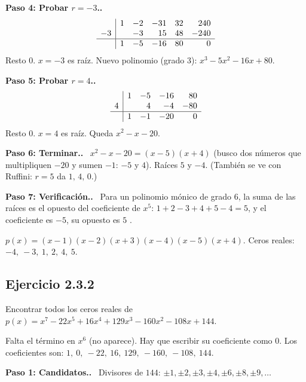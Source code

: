 \documentclass[11pt,a4paper]{article}
\newcommand{\paso}[1]{\par\medskip\noindent\textbf{\textcolor{blue!50!black}{Paso #1.}}\ }
\begin{document}
\paso{4: Probar $r=-3$.}
\[
\begin{array}{r|rrrrr}
 & 1 & -2 & -31 & 32 & 240\\
-3 & & -3 & 15 & 48 & -240\\ \hline
 & 1 & -5 & -16 & 80 & 0
\end{array}
\]
Resto $0$. $x=-3$ es raíz. Nuevo polinomio (grado $3$): $x^3-5x^2-16x+80$.

\paso{5: Probar $r=4$.}
\[
\begin{array}{r|rrrr}
 & 1 & -5 & -16 & 80\\
4 & & 4 & -4 & -80\\ \hline
 & 1 & -1 & -20 & 0
\end{array}
\]
Resto $0$. $x=4$ es raíz. Queda $x^2-x-20$.

\paso{6: Terminar.} $x^2-x-20=(x-5)(x+4)$ (busco dos números que multipliquen $-20$ y sumen $-1$: $-5$ y $4$). Raíces $5$ y $-4$. (También se ve con Ruffini: $r=5$ da $1,\,4,\,0$.)

\paso{7: Verificación.} Para un polinomio mónico de grado $6$, la suma de las raíces es el opuesto del coeficiente de $x^5$:
$1+2-3+4+5-4=5$, y el coeficiente es $-5$, su opuesto es $5$ \checkmark.
\begin{respuesta}
$p(x)=(x-1)(x-2)(x+3)(x-4)(x-5)(x+4)$. \quad Ceros reales: $-4,\ -3,\ 1,\ 2,\ 4,\ 5$.
\end{respuesta}

\subsection{Ejercicio 2.3.2}
\begin{enunciado}
Encontrar todos los ceros reales de $p(x)=x^7-22x^5+16x^4+129x^3-160x^2-108x+144$.
\end{enunciado}

\begin{cuidado}
Falta el término en $x^6$ (no aparece). Hay que escribir su coeficiente como $0$. Los coeficientes son:
$1,\ 0,\ -22,\ 16,\ 129,\ -160,\ -108,\ 144$.
\end{cuidado}

\paso{1: Candidatos.} Divisores de $144$: $\pm1,\pm2,\pm3,\pm4,\pm6,\pm8,\pm9,\dots$
\end{document}
